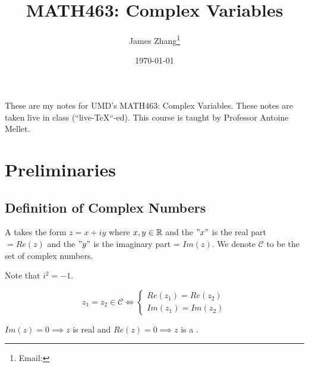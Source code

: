 \documentclass[12pt]{scrartcl}
\newcommand{\C}{\mathcal{C}}
\begin{document}
\title{MATH463: Complex Variables}
\author{James Zhang\thanks{Email: }}
\date{\today}




\maketitle
These are my notes for UMD's MATH463: Complex Variables. These notes are taken live in class 
(``live-\TeX``-ed). This course is taught by Professor Antoine Mellet.
\tableofcontents

\newpage

\section{Preliminaries}

\subsection{Definition of Complex Numbers}

\begin{definition}
    A  takes the form $z = x + iy$ where $x, y \in \mathbb R$ and the $"x"$ is the 
    real part $= Re(z)$ and the $"y"$ is the imaginary part = $Im(z)$. We denote $\C$ to be the set of 
    complex numbers.
\end{definition}

\begin{note}
  Note that $i^2 = -1$. 
\end{note}

\begin{note}
  \[z_1 = z_2 \in \C \Longleftrightarrow \begin{cases}
    Re(z_1) = Re(z_2) \\ 
    Im(z_1) = Im(z_2)
  \end{cases}\]
\end{note}

\begin{definition}
  $Im(z) = 0 \implies z$ is real and $Re(z) = 0 \implies z$ is a .
\end{definition}
\end{document}
